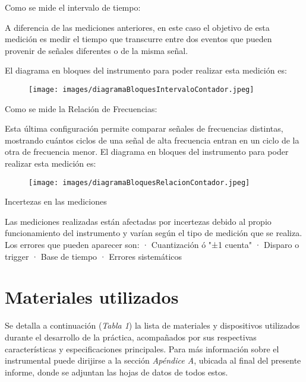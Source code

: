 \documentclass{article}
\begin{document}
	
	Como se mide el intervalo de tiempo:
	
	A diferencia de las mediciones anteriores, en este caso el objetivo de esta medición es medir el tiempo que transcurre entre dos eventos que pueden provenir de señales diferentes o de la misma señal.
	
	El diagrama en bloques del instrumento para poder realizar esta medición es:
	
	\begin{figure}[h]
		\centering
		\texttt{[image: images/diagramaBloquesIntervaloContador.jpeg]}
		\medskip
	\end{figure}
	\bigskip\bigskip
	
	Como se mide la Relación de Frecuencias:
	
	Esta última configuración permite comparar señales de frecuencias distintas, mostrando cuántos ciclos de una señal de alta frecuencia entran en un ciclo de la otra de frecuencia menor.
	\medskip
	El diagrama en bloques del instrumento para poder realizar esta medición es:
	
	\begin{figure}[h]
		\centering
		\texttt{[image: images/diagramaBloquesRelacionContador.jpeg]}
		\medskip
	\end{figure}
	\bigskip\bigskip
	
	Incertezas en las mediciones
	
		Las mediciones realizadas están afectadas por incertezas debido al propio funcionamiento del instrumento y varían según el tipo de medición que se realiza.
		\medskip
		Los errores que pueden aparecer son:
			· Cuantización ó "±1 cuenta"
			· Disparo o trigger
			· Base de tiempo
			· Errores sistemáticos
	
\bigskip\bigskip




\section{Materiales utilizados}

	Se detalla a continuación (\textit{Tabla 1}) la lista de materiales y dispositivos utilizados durante el desarrollo de la práctica, acompañados por sus respectivas características y especificaciones principales. Para más información sobre el instrumental puede dirijirse a la sección \textit{Apéndice A}, ubicada al final del presente informe, donde se adjuntan las hojas de datos de todos estos.
\bigskip\bigskip
\end{document}
